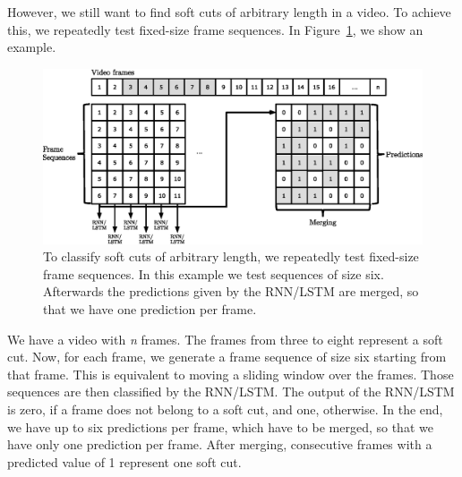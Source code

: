 However, we still want to find soft cuts of arbitrary length in a video.
To achieve this, we repeatedly test fixed-size frame sequences.
In Figure~\ref{fig:soft_cut_approach}, we show an example.
\begin{figure}[!htb]
	\centering
	\includegraphics[scale=.7]{images/soft_cut_approach.eps}
	\caption{To classify soft cuts of arbitrary length, we repeatedly test fixed-size frame sequences. In this example we test sequences of size six. Afterwards the predictions given by the RNN/LSTM are merged, so that we have one prediction per frame.}
	\label{fig:soft_cut_approach}
\end{figure}
We have a video with \textit{n} frames.
The frames from three to eight represent a soft cut.
Now, for each frame, we generate a frame sequence of size six starting from that frame.
This is equivalent to moving a sliding window over the frames.
Those sequences are then classified by the RNN/LSTM.
The output of the RNN/LSTM is zero, if a frame does not belong to a soft cut, and one, otherwise.
In the end, we have up to six predictions per frame, which have to be merged, so that we have only one prediction per frame.
After merging, consecutive frames with a predicted value of 1 represent one soft cut.

